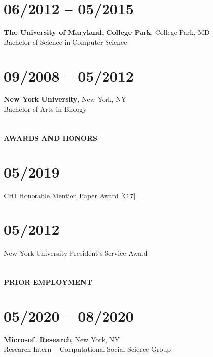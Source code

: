 \section{06/2012 -- 05/2015}

\textbf{The University of Maryland, College Park}, College Park, MD \\ Bachelor
of Science in Computer Science

\section{09/2008 -- 05/2012}

\textbf{New York University}, New York, NY \\
Bachelor of Arts in Biology

\section{} \vspace{0.1in} \textbf{AWARDS AND HONORS} \vspace{-0.05in}

\section{05/2019} CHI Honorable Mention Paper Award [C.7]

\section{05/2012} New York University President's Service Award


\section{} \vspace{0.1in} \textbf{PRIOR EMPLOYMENT} \vspace{-0.5em}

\section{05/2020 -- 08/2020}
\textbf{Microsoft Research}, New York, NY \\
Research Intern -- Computational Social Science Group

